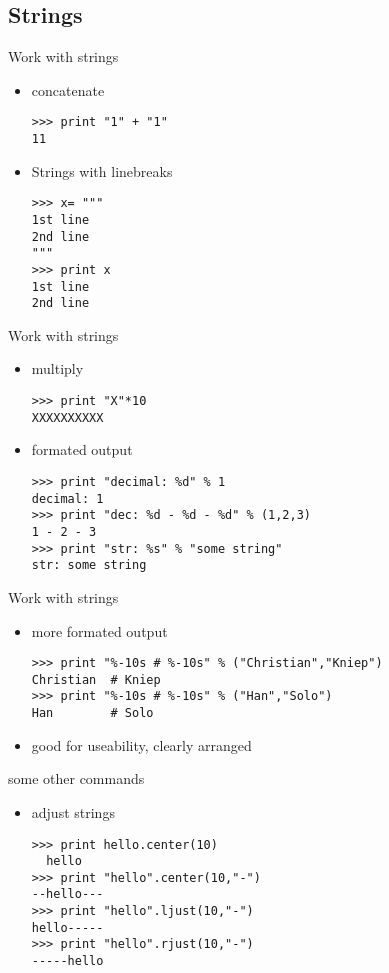 \documentclass[handout]{beamer}
\begin{document}
    \subsection{Strings}
		\begin{frame}[fragile]{Work with strings}
			\begin{itemize}
                \item<1-> concatenate
                \begin{lstlisting}
>>> print "1" + "1"
11
\end{lstlisting}
                \item<2-> Strings with linebreaks
\begin{lstlisting}
>>> x= """
1st line
2nd line
"""
>>> print x
1st line
2nd line
\end{lstlisting}
            \end{itemize}
		\end{frame}
		\begin{frame}[fragile]{Work with strings}
			\begin{itemize}
                \item<1-> multiply
                \begin{lstlisting}
>>> print "X"*10
XXXXXXXXXX
\end{lstlisting}
                \item<2-> formated output
\begin{lstlisting}
>>> print "decimal: %d" % 1
decimal: 1
>>> print "dec: %d - %d - %d" % (1,2,3)
1 - 2 - 3
>>> print "str: %s" % "some string"
str: some string
\end{lstlisting}
            \end{itemize}
		\end{frame}
		\begin{frame}[fragile]{Work with strings}
			\begin{itemize}
                \item<1-> more formated output
\begin{lstlisting}
>>> print "%-10s # %-10s" % ("Christian","Kniep")
Christian  # Kniep
>>> print "%-10s # %-10s" % ("Han","Solo")
Han        # Solo
\end{lstlisting}
            \item<2-> good for useability, clearly arranged
            \end{itemize}
		\end{frame}
		\begin{frame}[fragile]{some other commands}
			\begin{itemize}
                \item<1-> adjust strings
\begin{lstlisting}
>>> print hello.center(10)
  hello
>>> print "hello".center(10,"-")
--hello---
>>> print "hello".ljust(10,"-")
hello-----
>>> print "hello".rjust(10,"-")
-----hello
\end{lstlisting}
            \end{itemize}
		\end{frame}
\end{document}
